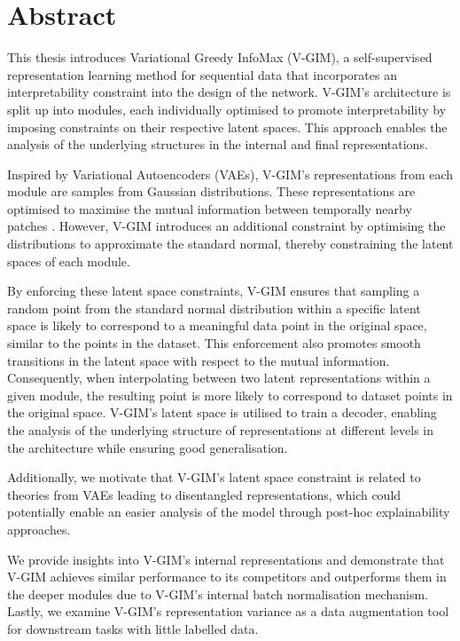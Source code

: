 \chapter*{ Abstract}

This thesis introduces Variational Greedy InfoMax (V-GIM), a self-supervised representation learning method for sequential data that incorporates an interpretability constraint into the design of the network. V-GIM's architecture is split up into modules, each individually optimised to promote interpretability by imposing constraints on their respective latent spaces. This approach enables the analysis of the underlying structures in the internal and final representations.

Inspired by Variational Autoencoders (VAEs), V-GIM's representations from each module are samples from Gaussian distributions. These representations are optimised to maximise the mutual information between temporally nearby patches \citep{lowePuttingEndEndtoEnd2020a}. However, V-GIM introduces an additional constraint by optimising the distributions to approximate the standard normal, thereby constraining the latent spaces of each module.


By enforcing these latent space constraints, V-GIM ensures that sampling a random point from the standard normal distribution within a specific latent space is likely to correspond to a meaningful data point in the original space, similar to the points in the dataset. This enforcement also promotes smooth transitions in the latent space with respect to the mutual information. Consequently, when interpolating between two latent representations within a given module, the resulting point is more likely to correspond to dataset points in the original space. V-GIM's latent space is utilised to train a decoder, enabling the analysis of the underlying structure of representations at different levels in the architecture while ensuring good generalisation.

Additionally, we motivate that V-GIM's latent space constraint is related to theories from VAEs leading to disentangled representations, which could potentially enable an easier analysis of the model through post-hoc explainability approaches. 

We provide insights into V-GIM's internal representations and demonstrate that V-GIM achieves similar performance to its competitors and outperforms them in the deeper modules due to V-GIM's internal batch normalisation mechanism. Lastly, we examine V-GIM's representation variance as a data augmentation tool for downstream tasks with little labelled data.




